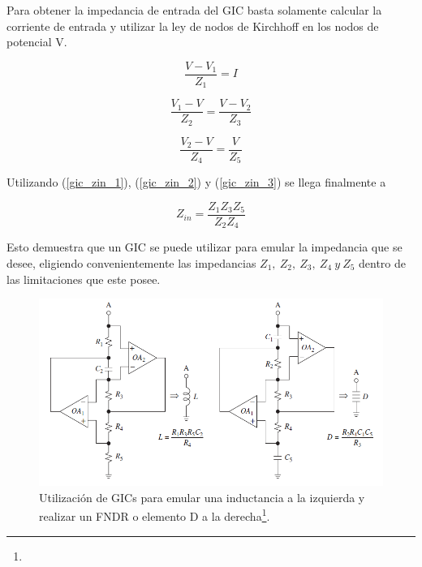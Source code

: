 
Para obtener la impedancia de entrada del GIC basta solamente calcular la corriente de entrada y utilizar la ley de nodos de Kirchhoff en los nodos de potencial V.

\begin{equation}
\frac{V-V_1}{Z_1}=I
\label{gic_zin_1}
\end{equation}

\begin{equation}
\frac{V_1-V}{Z_2} = \frac{V-V_2}{Z_3}
\label{gic_zin_2}
\end{equation}

\begin{equation}
\frac{V_2-V}{Z_4} = \frac{V}{Z_5}
\label{gic_zin_3}
\end{equation}

Utilizando (\ref{gic_zin_1}), (\ref{gic_zin_2}) y (\ref{gic_zin_3}) se llega finalmente a

\begin{equation}
Z_{in} = \frac{Z_1 Z_3 Z_5}{Z_2 Z_4}
\label{grounded_gic_zin}
\end{equation}

Esto demuestra que un GIC se puede utilizar para emular la impedancia que se desee, eligiendo convenientemente las impedancias $Z_1, \ Z_2, \ Z_3, \ Z_4 \ y \ Z_5$ dentro de las limitaciones que este posee.

\begin{figure}[H]
	\centering
	\includegraphics[width=1\textwidth]{Imagenes1/gic_ind_fndr.PNG}
	\caption[]{Utilización de GICs para emular una inductancia a la izquierda y realizar un FNDR o elemento D a la derecha\protect\footnote{}.}
	\label{fig:gic_ind_fndr}
\end{figure}

